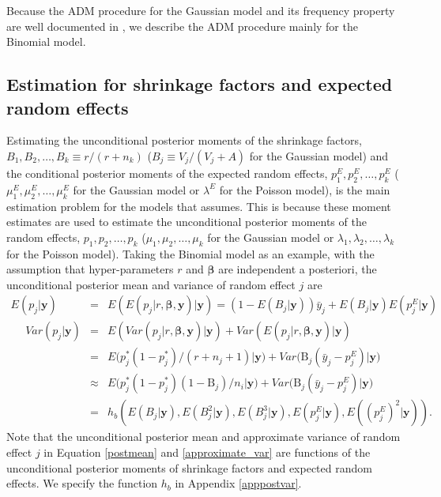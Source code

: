 \documentclass[article]{jss}
\begin{document}
Because the ADM procedure for the Gaussian model and its frequency property are well documented in \cite{kelly2014advances}, we describe  the ADM procedure mainly for the Binomial model. 

\subsection[shrinkage]{Estimation for shrinkage factors and expected random effects}\label{shrinkage}

Estimating the unconditional posterior moments of the shrinkage factors, $B_1, B_2, \ldots, B_k\equiv r/(r+n_k)$ ($B_j\equiv V_j/(V_j+A)$ for the Gaussian model) and the conditional posterior moments of the expected random effects, $p^E_1, p^E_2, \ldots, p^E_k$ ($\mu^E_1, \mu^E_2, \ldots, \mu^E_k$ for the Gaussian model or $\lambda^E$ for the Poisson model), is the main estimation problem for the  models that  assumes. This is because these moment estimates are used to estimate the unconditional posterior moments of the random effects, $p_1, p_2, \ldots, p_k$ ($\mu_1, \mu_2, \ldots, \mu_k$ for the Gaussian model or $\lambda_1, \lambda_2, \ldots, \lambda_k$ for the Poisson model). Taking the Binomial model as an example, with the assumption that hyper-parameters $r$ and $\boldsymbol{\beta}$ are independent a posteriori, the unconditional posterior mean and variance of random effect $j$ are
\begin{eqnarray}
E(p_{j}\vert \boldsymbol{y}) &=&E(E(p_{j}\vert r, \boldsymbol{\beta}, \boldsymbol{y})\vert\boldsymbol{y})=(1-E(B_j\vert\boldsymbol{y}))\bar{y}_j + E(B_j\vert  \boldsymbol{y})E(p^E_{j}\vert  \boldsymbol{y})\label{postmean} \\
~~~~~~Var(p_{j}\vert \boldsymbol{y}) &=&  E(Var(p_{j}\vert r, \boldsymbol{\beta}, \boldsymbol{y})\vert \boldsymbol{y})+Var(E(p_{j}\vert r, \boldsymbol{\beta},\boldsymbol{y})\vert \boldsymbol{y})\label{postvar}\\
&=& E\big(p^{\ast}_{j}(1-p^{\ast}_{j})/ (r+n_{j}+1)\vert  \boldsymbol{y}\big)+Var\big(\textrm{B}_{j}(\bar{y}_{j}-p^E_{j})\vert \boldsymbol{y}\big) \\
&\approx&E\big(p^{\ast}_{j}(1-p^{\ast}_{j})(1-\textrm{B}_{j})/n_{i}\vert \boldsymbol{y}\big)+Var\big(\textrm{B}_{j}(\bar{y}_{j}-p^E_{j})\vert \boldsymbol{y}\big)\\
&=&h_b(E(B_j\vert\boldsymbol{y}), E(B^2_j\vert\boldsymbol{y}), E(B^3_j\vert\boldsymbol{y}),  E(p^E_{j}\vert\boldsymbol{y}), E((p^E_{j})^2\vert\boldsymbol{y})).\label{approximate_var}
\end{eqnarray}
Note that the unconditional posterior mean and approximate variance of random effect $j$ in Equation \ref{postmean}  and \ref{approximate_var}  are functions of the unconditional posterior moments of shrinkage factors and expected random effects. We specify the function $h_b$  in Appendix \ref{apppostvar}.  
\end{document}
